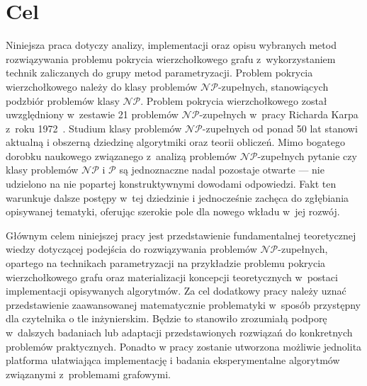 \section{Cel}\label{Section_Aim}
\par{
  Niniejsza praca dotyczy analizy, implementacji oraz opisu wybranych metod rozwiązywania problemu pokrycia wierzchołkowego grafu z~wykorzystaniem technik zaliczanych do grupy metod parametryzacji.
  Problem pokrycia wierzchołkowego należy do klasy problemów $\mathcal{NP}$-zupełnych, stanowiących podzbiór problemów klasy $\mathcal{NP}$.
  Problem pokrycia wierzchołkowego został uwzględniony w~zestawie 21 problemów $\mathcal{NP}$-zupełnych w~pracy Richarda Karpa z~roku 1972~\cite{DBLP:Karp10}.
  Studium klasy problemów $\mathcal{NP}$-zupełnych od ponad 50 lat stanowi aktualną i obszerną dziedzinę algorytmiki oraz teorii obliczeń.
  Mimo bogatego dorobku naukowego związanego z~analizą problemów $\mathcal{NP}$-zupełnych pytanie czy klasy problemów $\mathcal{NP}$ i $\mathcal{P}$ są jednoznaczne nadal pozostaje otwarte --- nie udzielono na nie popartej konstruktywnymi dowodami odpowiedzi.
  Fakt ten warunkuje dalsze postępy w~tej dziedzinie i jednocześnie zachęca do zgłębiania opisywanej tematyki, oferując szerokie pole dla nowego wkładu w~jej rozwój.
}
\par{
  Głównym celem niniejszej pracy jest przedstawienie fundamentalnej teoretycznej wiedzy dotyczącej podejścia do rozwiązywania problemów $\mathcal{NP}$-zupełnych, opartego na technikach parametryzacji na przykładzie problemu pokrycia wierzchołkowego grafu oraz materializacji koncepcji teoretycznych w~postaci implementacji opisywanych algorytmów.
  Za cel dodatkowy pracy należy uznać przedstawienie zaawansowanej matematycznie problematyki w~sposób przystępny dla czytelnika o tle inżynierskim.
  Będzie to stanowiło zrozumiałą podporę w~dalszych badaniach lub adaptacji przedstawionych rozwiązań do konkretnych problemów praktycznych.
  Ponadto w pracy zostanie utworzona możliwie jednolita platforma ułatwiająca implementację i badania eksperymentalne algorytmów związanymi z~problemami grafowymi.
}
